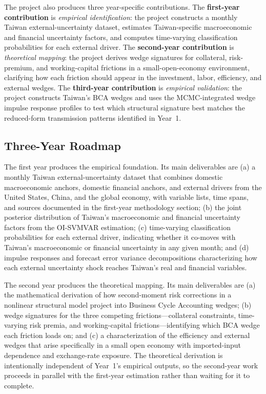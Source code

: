 \documentclass[12pt]{article}
\begin{document}
The project also produces three year-specific contributions. The \textbf{first-year contribution} is \emph{empirical identification}: the project constructs a monthly Taiwan external-uncertainty dataset, estimates Taiwan-specific macroeconomic and financial uncertainty factors, and computes time-varying classification probabilities for each external driver. The \textbf{second-year contribution} is \emph{theoretical mapping}: the project derives wedge signatures for collateral, risk-premium, and working-capital frictions in a small-open-economy environment, clarifying how each friction should appear in the investment, labor, efficiency, and external wedges. The \textbf{third-year contribution} is \emph{empirical validation}: the project constructs Taiwan's BCA wedges and uses the MCMC-integrated wedge impulse response profiles to test which structural signature best matches the reduced-form transmission patterns identified in Year~1.

\subsection{Three-Year Roadmap}

The first year produces the empirical foundation. Its main deliverables are (a) a monthly Taiwan external-uncertainty dataset that combines domestic macroeconomic anchors, domestic financial anchors, and external drivers from the United States, China, and the global economy, with variable lists, time spans, and sources documented in the first-year methodology section; (b) the joint posterior distribution of Taiwan's macroeconomic and financial uncertainty factors from the OI-SVMVAR estimation; (c) time-varying classification probabilities for each external driver, indicating whether it co-moves with Taiwan's macroeconomic or financial uncertainty in any given month; and (d) impulse responses and forecast error variance decompositions characterizing how each external uncertainty shock reaches Taiwan's real and financial variables.

The second year produces the theoretical mapping. Its main deliverables are (a) the mathematical derivation of how second-moment risk corrections in a nonlinear structural model project into Business Cycle Accounting wedges; (b) wedge signatures for the three competing frictions---collateral constraints, time-varying risk premia, and working-capital frictions---identifying which BCA wedge each friction loads on; and (c) a characterization of the efficiency and external wedges that arise specifically in a small open economy with imported-input dependence and exchange-rate exposure. The theoretical derivation is intentionally independent of Year~1's empirical outputs, so the second-year work proceeds in parallel with the first-year estimation rather than waiting for it to complete.
\end{document}

